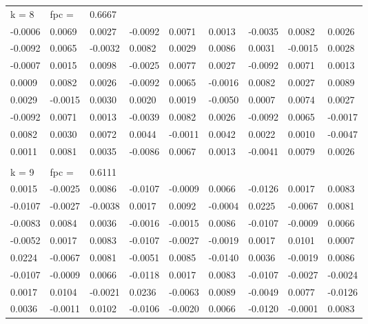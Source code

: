 \documentclass[letterpaper, 12pt]{article}
\begin{document}
\begin{table}[]
\begin{tabular}{lllllllll}
k = 8   & fpc =   & 0.6667  &         &         &         &         &         &         \\
-0.0006 & 0.0069  & 0.0027  & -0.0092 & 0.0071  & 0.0013  & -0.0035 & 0.0082  & 0.0026  \\
-0.0092 & 0.0065  & -0.0032 & 0.0082  & 0.0029  & 0.0086  & 0.0031  & -0.0015 & 0.0028  \\
-0.0007 & 0.0015  & 0.0098  & -0.0025 & 0.0077  & 0.0027  & -0.0092 & 0.0071  & 0.0013  \\
0.0009  & 0.0082  & 0.0026  & -0.0092 & 0.0065  & -0.0016 & 0.0082  & 0.0027  & 0.0089  \\
0.0029  & -0.0015 & 0.0030  & 0.0020  & 0.0019  & -0.0050 & 0.0007  & 0.0074  & 0.0027  \\
-0.0092 & 0.0071  & 0.0013  & -0.0039 & 0.0082  & 0.0026  & -0.0092 & 0.0065  & -0.0017 \\
0.0082  & 0.0030  & 0.0072  & 0.0044  & -0.0011 & 0.0042  & 0.0022  & 0.0010  & -0.0047 \\
0.0011  & 0.0081  & 0.0035  & -0.0086 & 0.0067  & 0.0013  & -0.0041 & 0.0079  & 0.0026  \\
        &         &         &         &         &         &         &         &         \\
k = 9   & fpc =   & 0.6111  &         &         &         &         &         &         \\
0.0015  & -0.0025 & 0.0086  & -0.0107 & -0.0009 & 0.0066  & -0.0126 & 0.0017  & 0.0083  \\
-0.0107 & -0.0027 & -0.0038 & 0.0017  & 0.0092  & -0.0004 & 0.0225  & -0.0067 & 0.0081  \\
-0.0083 & 0.0084  & 0.0036  & -0.0016 & -0.0015 & 0.0086  & -0.0107 & -0.0009 & 0.0066  \\
-0.0052 & 0.0017  & 0.0083  & -0.0107 & -0.0027 & -0.0019 & 0.0017  & 0.0101  & 0.0007  \\
0.0224  & -0.0067 & 0.0081  & -0.0051 & 0.0085  & -0.0140 & 0.0036  & -0.0019 & 0.0086  \\
-0.0107 & -0.0009 & 0.0066  & -0.0118 & 0.0017  & 0.0083  & -0.0107 & -0.0027 & -0.0024 \\
0.0017  & 0.0104  & -0.0021 & 0.0236  & -0.0063 & 0.0089  & -0.0049 & 0.0077  & -0.0126 \\
0.0036  & -0.0011 & 0.0102  & -0.0106 & -0.0020 & 0.0066  & -0.0120 & -0.0001 & 0.0083  \\

\end{tabular}
\end{table}
\end{document}
